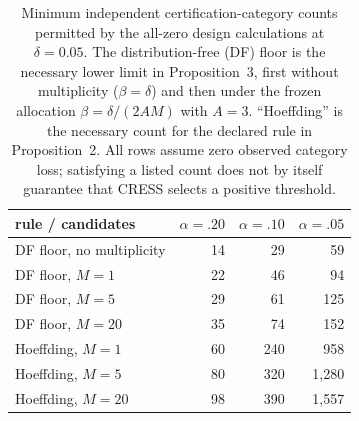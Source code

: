 \begin{table}[t]
\centering
\caption{Minimum independent certification-category counts permitted by the all-zero design calculations at $\delta=0.05$. The distribution-free (DF) floor is the necessary lower limit in Proposition~3, first without multiplicity ($\beta=\delta$) and then under the frozen allocation $\beta=\delta/(2AM)$ with $A=3$. ``Hoeffding'' is the necessary count for the declared rule in Proposition~2. All rows assume zero observed category loss; satisfying a listed count does not by itself guarantee that CRESS selects a positive threshold.}
\label{tab:certificate-feasibility}
\footnotesize
\setlength{\tabcolsep}{4pt}
\begin{tabular}{lrrr}
\toprule
rule / candidates & $\alpha=.20$ & $\alpha=.10$ & $\alpha=.05$ \\
\midrule
DF floor, no multiplicity & 14 & 29 & 59 \\
\midrule
DF floor, $M=1$  & 22 & 46 & 94 \\
DF floor, $M=5$  & 29 & 61 & 125 \\
DF floor, $M=20$ & 35 & 74 & 152 \\
\midrule
Hoeffding, $M=1$  & 60 & 240 & 958 \\
Hoeffding, $M=5$  & 80 & 320 & 1,280 \\
Hoeffding, $M=20$ & 98 & 390 & 1,557 \\
\bottomrule
\end{tabular}
\end{table}
